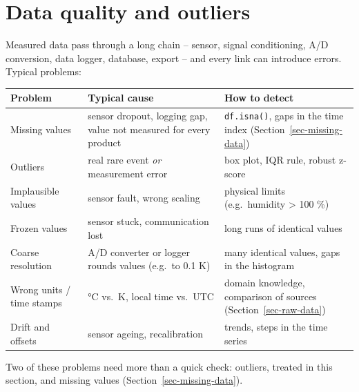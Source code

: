 \documentclass[
  letterpaper,
  DIV=11,
  numbers=noendperiod]{scrreprt}
\begin{document}
\section{Data quality and outliers}\label{sec-outliers}

Measured data pass through a long chain -- sensor, signal conditioning,
A/D conversion, data logger, database, export -- and every link can
introduce errors. Typical problems:

\begin{longtable}[]{@{}
  >{\raggedright\arraybackslash}p{}
  >{\raggedright\arraybackslash}p{}
  >{\raggedright\arraybackslash}p{}@{}}
\toprule\noalign{}
\begin{minipage}[b]{\linewidth}\raggedright
Problem
\end{minipage} & \begin{minipage}[b]{\linewidth}\raggedright
Typical cause
\end{minipage} & \begin{minipage}[b]{\linewidth}\raggedright
How to detect
\end{minipage} \\
\midrule\noalign{}
\endhead
\bottomrule\noalign{}
\endlastfoot
Missing values & sensor dropout, logging gap, value not measured for
every product & \texttt{df.isna()}, gaps in the time index
(Section~\ref{sec-missing-data}) \\
Outliers & real rare event \emph{or} measurement error & box plot, IQR
rule, robust z-score \\
Implausible values & sensor fault, wrong scaling & physical limits
(e.g.~humidity \textgreater{} 100 \%) \\
Frozen values & sensor stuck, communication lost & long runs of
identical values \\
Coarse resolution & A/D converter or logger rounds values (e.g.~to 0.1
K) & many identical values, gaps in the histogram \\
Wrong units / time stamps & °C vs.~K, local time vs.~UTC & domain
knowledge, comparison of sources (Section~\ref{sec-raw-data}) \\
Drift and offsets & sensor ageing, recalibration & trends, steps in the
time series \\
\end{longtable}

Two of these problems need more than a quick check: outliers, treated in
this section, and missing values (Section~\ref{sec-missing-data}).
\end{document}
